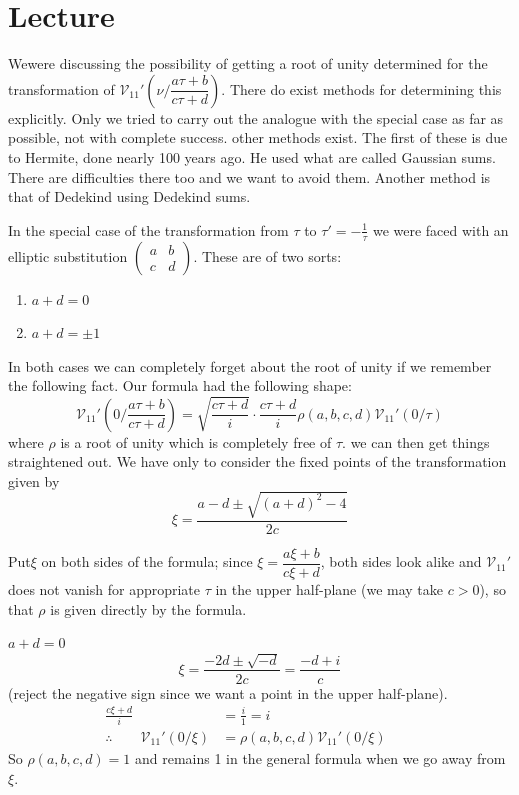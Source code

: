 \chapter{Lecture}\label{part2:lec15} %

We\pageoriginale were discussing the possibility of getting a root of
unity determined for the transformation of $\mathscr{V}_{11}'\left(\nu
\Big/ \dfrac{a \tau+ b}{c\tau +d}\right)$. There do exist methods for
determining this explicitly. Only we tried to carry out the analogue
with the special case as far as possible, not with complete
success. other methods exist. The first of these is due to Hermite,
done nearly 100 years ago. He used what are called Gaussian
sums. There are difficulties there too and we want to avoid
them. Another method is that of Dedekind using Dedekind sums.

In the special case of the transformation from $\tau$ to $\tau' =-
\frac{1}{\tau}$ we were faced with an elliptic substitution
$\left( \begin{smallmatrix} a & b\\ c &
  d\end{smallmatrix}\right)$. These are of two sorts:
\begin{enumerate}
\item $a+d=0$
\item $a+d=\pm 1$
\end{enumerate}
 In both cases we can completely forget about the root of unity if we
 remember the following fact. Our formula had the following shape:
\begin{equation*}
  \mathscr{V}_{11}' \left(0 \Big/ \frac{a \tau+b}{c\tau+d} \right)=
  \sqrt{\frac{c\tau+d}{i}} \cdot \frac{c \tau+d}{i} \rho (a, b, c, d)
  \mathscr{V}_{11}' (0 /\tau) \tag{*}\label{part2:lec15:eq*} 
\end{equation*}
where $\rho$ is a root of unity which is completely free of $\tau$. we
can then get things straightened out. We have only to consider the
fixed points of the transformation given by
$$
\xi= \frac{a-d \pm \sqrt{(a+d)^2-4}}{2c}
$$

Put\pageoriginale $\xi$ on both sides of the formula; since $\xi =
\dfrac{a \xi +b}{c \xi +d}$, both sides look alike and
$\mathscr{V}_{11}'$ does not vanish for appropriate $\tau$ in the
upper half-plane (we may take $c> 0$), so that $\rho$ is given directly
by the formula.

\begin{case}\label{part2:lec15:case1}
  $a+d=0$
  $$
  \xi = \frac{- 2d \pm \sqrt{-d}}{2c} =  \frac{- d + i}{c}
  $$
  (reject the negative sign since we want a point in the upper
  half-plane). 
  \begin{align*}
    \frac{c \xi+d}{i} &= \frac{i}{1} = i\\
    \therefore \qquad \mathscr{V}_{11}' (0 / \xi) & = \rho (a, b, c,
    d) \mathscr{V}_{11}' (0/\xi)\qquad 
  \end{align*}
  So $\rho (a, b, c, d)=1$ and remains 1 in the general formula when
  we go away from $\xi$.
\end{case}

